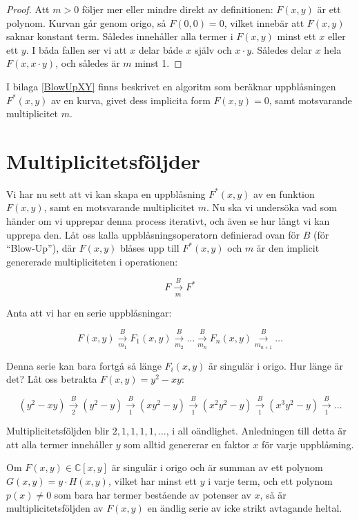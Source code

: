\begin{proof}
Att $m>0$ följer mer eller mindre direkt av definitionen: $F(x,y)$ är ett polynom. Kurvan går genom origo, så $F(0,0)=0$, vilket innebär att $F(x,y)$ saknar konstant term. Således innehåller alla termer i $F(x,y)$ minst ett $x$ eller ett $y$. I båda fallen ser vi att $x$ delar både $x$ själv och $x\cdot y$. Således delar $x$ hela $F(x,x\cdot y)$, och således är $m$ minst 1.
\end{proof}

I bilaga \ref{BlowUpXY} finns beskrivet en algoritm som beräknar uppblåsningen $F^*(x,y)$ av en kurva, givet dess implicita form $F(x,y)=0$, samt motsvarande multiplicitet $m$.

\section{Multiplicitetsföljder}

Vi har nu sett att vi kan skapa en uppblåsning $F^*(x,y)$ av en funktion $F(x,y)$, samt en motsvarande multiplicitet $m$. Nu ska vi undersöka vad som händer om vi upprepar denna process iterativt, och även se hur långt vi kan upprepa den. Låt oss kalla uppblåsningsoperatorn definierad ovan för $B$ (för ``Blow-Up''), där $F(x,y)$ blåses upp till $F^*(x,y)$ och $m$ är den implicit genererade multipliciteten i operationen:

\[F \overset{B}{\underset{m}{\longrightarrow}} F^*\]

Anta att vi har en serie uppblåsningar:

\[
F(x,y) \overset{B}{\underset{m_1}{\longrightarrow}} F_1(x,y) \overset{B}{\underset{m_2}{\longrightarrow}} \ldots \overset{B}{\underset{m_n}{\longrightarrow}} F_n(x,y) \overset{B}{\underset{m_{n+1}}{\longrightarrow}} \ldots
\]

Denna serie kan bara fortgå så länge $F_i(x,y)$ är singulär i origo. Hur länge är det? Låt oss betrakta $F(x,y)=y^2-xy$:

\[
(y^2-xy) \overset{B}{\underset{2}{\longrightarrow}} (y^2-y) \overset{B}{\underset{1}{\longrightarrow}} (xy^2-y) \overset{B}{\underset{1}{\longrightarrow}} (x^2y^2-y) \overset{B}{\underset{1}{\longrightarrow}} (x^3y^2-y) \overset{B}{\underset{1}{\longrightarrow}} \ldots
\]

Multiplicitetsföljden blir $2,1,1,1,1,\ldots$, i all oändlighet. Anledningen till detta är att alla termer innehåller $y$ som alltid genererar en faktor $x$ för varje uppblåsning.

\begin{Theorem}
\label{FiniteMultiplicitySequence}
Om $F(x,y)\in \mathbb{C}[x,y]$ är singulär i origo och är summan av ett polynom $G(x,y)=y\cdot H(x,y)$, vilket har minst ett $y$ i varje term, och ett polynom $p(x) \neq 0$ som bara har termer bestående av potenser av $x$, så är multiplicitetsföljden av $F(x,y)$ en ändlig serie av icke strikt avtagande heltal.
\end{Theorem}

